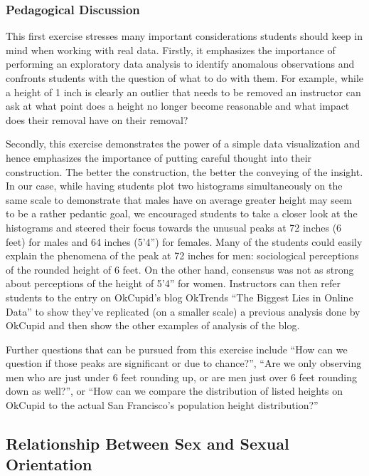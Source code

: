 \documentclass{article}\usepackage[]{graphicx}\usepackage[]{color}
\begin{document}
\subsubsection{Pedagogical Discussion}
This first exercise stresses many important considerations students should keep in mind when working with real data.  Firstly, it emphasizes the importance of performing an exploratory data analysis to identify anomalous observations and confronts students with the question of what to do with them.  For example, while a height of 1 inch is clearly an outlier that needs to be removed an instructor can ask at what point does a height no longer become reasonable and what impact does their removal have on their removal?

Secondly, this exercise demonstrates the power of a simple data visualization and hence emphasizes the importance of putting careful thought into their construction.  The better the construction, the better the conveying of the insight.  In our case, while having students plot two histograms simultaneously on the same scale to demonstrate that males have on average greater height may seem to be a rather pedantic goal, we encouraged students to take a closer look at the histograms and steered their focus towards the unusual peaks at 72 inches (6 feet) for males and 64 inches (5'4'') for females.  Many of the students could easily explain the phenomena of the peak at 72 inches for men: sociological perceptions of the rounded height of 6 feet.  On the other hand, consensus was not as strong about perceptions of the height of 5'4'' for women.  Instructors can then refer students to the entry on OkCupid's blog OkTrends ``The Biggest Lies in Online Data''\cite{OkTrendsLies} to show they've replicated (on a smaller scale) a previous analysis done by OkCupid and then show the other examples of analysis of the blog.

Further questions that can be pursued from this exercise include ``How can we question if those peaks are significant or due to chance?'', ``Are we only observing men who are just under 6 feet rounding up, or are men just over 6 feet rounding down as well?'', or ``How can we compare the distribution of listed heights on OkCupid to the actual San Francisco's population height distribution?''







\subsection{Relationship Between Sex and Sexual Orientation}
\end{document}
